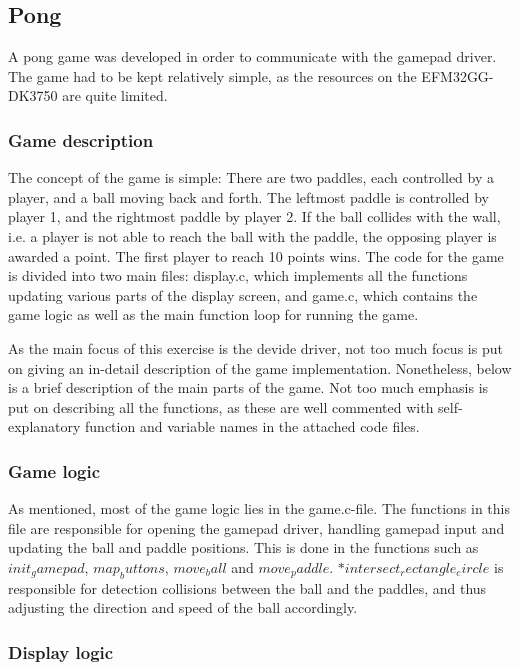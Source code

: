 \subsection{Pong}
A pong game was developed in order to communicate with the gamepad driver. The game had to be kept relatively simple, as the resources on the EFM32GG-DK3750 are quite limited.

\subsubsection{Game description}

The concept of the game is simple: There are two paddles, each controlled by a player, and a ball moving back and forth. The leftmost paddle is controlled by player 1, and the rightmost paddle by player 2. If the ball collides with the wall, i.e. a player is not able to reach the ball with the paddle, the opposing player is awarded a point. The first player to reach 10 points wins. The code for the game is divided into two main files: display.c, which implements all the functions updating various parts of the display screen, and game.c, which contains the game logic as well as the main function loop for running the game.

As the main focus of this exercise is the devide driver, not too much focus is put on giving an in-detail description of the game implementation. Nonetheless, below is a brief description of the main parts of the game. Not too much emphasis is put on describing all the functions, as these are well commented with self-explanatory function and variable names in the attached code files.

\subsubsection{Game logic}

As mentioned, most of the game logic lies in the game.c-file. The functions in this file are responsible for opening the gamepad driver, handling gamepad input and updating the ball and paddle positions. This is done in the functions such as \emph{$init_gamepad$}, \emph{$map_buttons$}, \emph{$move_ball$} and \emph{$move_paddle$}. \emph{$*intersect_rectangle_circle$} is responsible for detection collisions between the ball and the paddles, and thus adjusting the direction and speed of the ball accordingly.

\subsubsection{Display logic}

